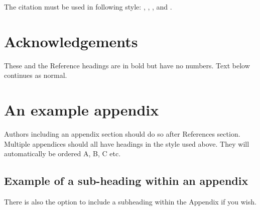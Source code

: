 \documentclass[3p,times,procedia]{elsarticle}
\begin{document}
The citation must be used in following style: \cite{article-minimal}, \cite{article-full}, \cite{article-crossref}, \cite{whole-journal} and \cite{inbook-minimal}.

\section*{Acknowledgements}

These and the Reference headings are in bold but have no numbers. Text below continues as normal.
















\appendix
\section{An example appendix}
Authors including an appendix section should do so after References section. Multiple appendices should all have headings in the style used above. They will automatically be ordered A, B, C etc.

\subsection{Example of a sub-heading within an appendix}
There is also the option to include a subheading within the Appendix if you wish.
\end{document}
